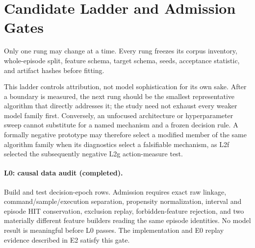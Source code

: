 \documentclass[11pt]{article}
\begin{document}
\section{Candidate Ladder and Admission Gates}

Only one rung may change at a time.  Every rung freezes its corpus inventory,
whole-episode split, feature schema, target schema, seeds, acceptance statistic,
and artifact hashes before fitting.

This ladder controls attribution, not model sophistication for its own sake.
After a boundary is measured, the next rung should be the smallest
representative algorithm that directly addresses it; the study need not exhaust
every weaker model family first.  Conversely, an unfocused architecture or
hyperparameter sweep cannot substitute for a named mechanism and a frozen
decision rule.  A formally negative prototype may therefore select a modified
member of the same algorithm family when its diagnostics select a falsifiable
mechanism, as L2f selected the subsequently negative L2g action-measure test.

\paragraph{L0: causal data audit (completed).}
Build and test decision-epoch rows.  Admission requires exact raw linkage,
command/sample/execution separation, propensity normalization, interval and
episode HIT conservation, exclusion replay, forbidden-feature rejection, and
two materially different feature builders reading the same episode identities.
No model result is meaningful before L0 passes.  The implementation and E0
replay evidence described in E2 satisfy this gate.
\end{document}
